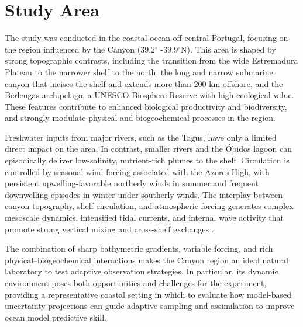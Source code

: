 \section{Study Area}

The study was conducted in the coastal ocean off central Portugal,
focusing on the region influenced by the \naz Canyon (39.2$^{\circ}$
-39.9$^{\circ}$N). This area is shaped by strong topographic contrasts,
including the transition from the wide Estremadura Plateau to the
narrower shelf to the north, the long and narrow \naz submarine canyon
that incises the shelf and extends more than 200 km offshore, and the
Berlengas archipelago, a UNESCO Biosphere Reserve with high ecological
value. These features contribute to enhanced biological productivity and
biodiversity, and strongly modulate physical and biogeochemical
processes in the region.

Freshwater inputs from major rivers, such as the Tagus, have only a
limited direct impact on the area. In contrast, smaller rivers and the
\'{O}bidos lagoon can episodically deliver low-salinity, nutrient-rich
plumes to the shelf. Circulation is controlled by seasonal wind forcing
associated with the Azores High, with persistent upwelling-favorable
northerly winds in summer and frequent downwelling episodes in winter
under southerly winds. The interplay between canyon topography, shelf
circulation, and atmospheric forcing generates complex mesoscale
dynamics, intensified tidal currents, and internal wave activity that
promote strong vertical mixing and cross-shelf exchanges
\cite{martins10,quaresma07}.

The combination of sharp bathymetric gradients, variable forcing, and
rich physical–biogeochemical interactions makes the \naz Canyon region
an ideal natural laboratory to test adaptive observation strategies. In
particular, its dynamic environment poses both opportunities and
challenges for the \proj experiment, providing a representative coastal
setting in which to evaluate how model-based uncertainty projections can
guide adaptive sampling and assimilation to improve ocean model
predictive skill.
